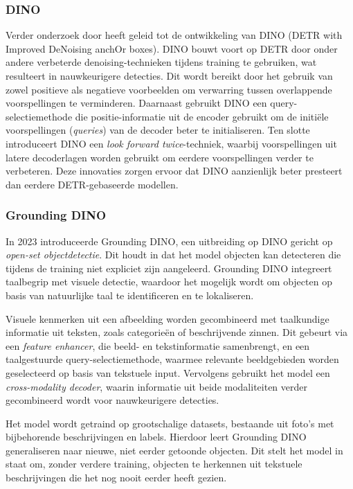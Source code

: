\subsubsection{DINO}

Verder onderzoek door \textcite{Zhang2022} heeft geleid tot de ontwikkeling van DINO (DETR with Improved DeNoising anchOr boxes). 
DINO bouwt voort op DETR door onder andere verbeterde denoising-technieken tijdens training te gebruiken, wat resulteert in nauwkeurigere detecties. 
Dit wordt bereikt door het gebruik van zowel positieve als negatieve voorbeelden om verwarring tussen overlappende voorspellingen te verminderen. 
Daarnaast gebruikt DINO een query-selectiemethode die positie-informatie uit de encoder gebruikt om de initiële voorspellingen (\textit{queries}) van de decoder beter te initialiseren. 
Ten slotte introduceert DINO een \textit{look forward twice}-techniek, waarbij voorspellingen uit latere decoderlagen worden gebruikt om eerdere voorspellingen verder te verbeteren. 
Deze innovaties zorgen ervoor dat DINO aanzienlijk beter presteert dan eerdere DETR-gebaseerde modellen.

\subsubsection{Grounding DINO}

In 2023 introduceerde \textcite{Liu2023} Grounding DINO, een uitbreiding op DINO gericht op \textit{open-set objectdetectie}. Dit houdt in dat het model objecten kan detecteren die tijdens de training niet expliciet zijn aangeleerd. 
Grounding DINO integreert taalbegrip met visuele detectie, waardoor het mogelijk wordt om objecten op basis van natuurlijke taal te identificeren en te lokaliseren.

Visuele kenmerken uit een afbeelding worden gecombineerd met taalkundige informatie uit teksten, zoals categorieën of beschrijvende zinnen. 
Dit gebeurt via een \textit{feature enhancer}, die beeld- en tekstinformatie samenbrengt, en een taalgestuurde query-selectiemethode, waarmee relevante beeldgebieden worden geselecteerd op basis van tekstuele input. 
Vervolgens gebruikt het model een \textit{cross-modality decoder}, waarin informatie uit beide modaliteiten verder gecombineerd wordt voor nauwkeurigere detecties.

Het model wordt getraind op grootschalige datasets, bestaande uit foto's met bijbehorende beschrijvingen en labels. 
Hierdoor leert Grounding DINO generaliseren naar nieuwe, niet eerder getoonde objecten. Dit stelt het model in staat om, zonder verdere training, objecten te herkennen uit tekstuele beschrijvingen die het nog nooit eerder heeft gezien.

